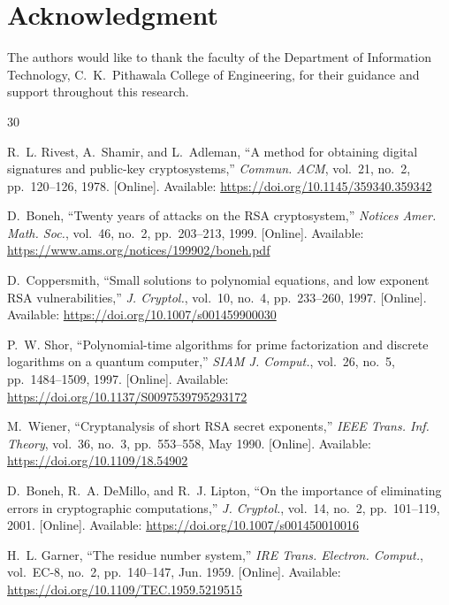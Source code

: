 \documentclass[journal]{IEEEtran}
\begin{document}
\section*{Acknowledgment}

The authors would like to thank the faculty of the Department of Information Technology, C.~K.~Pithawala College of Engineering, for their guidance and support throughout this research.


\ifCLASSOPTIONcaptionsoff
\newpage
\fi


\begin{thebibliography}{30}

R.~L. Rivest, A.~Shamir, and L.~Adleman, ``A method for obtaining digital signatures and public-key cryptosystems,'' \textit{Commun. ACM}, vol.~21, no.~2, pp.~120--126, 1978. [Online]. Available: \url{https://doi.org/10.1145/359340.359342}

D.~Boneh, ``Twenty years of attacks on the RSA cryptosystem,'' \textit{Notices Amer. Math. Soc.}, vol.~46, no.~2, pp.~203--213, 1999. [Online]. Available: \url{https://www.ams.org/notices/199902/boneh.pdf}

D.~Coppersmith, ``Small solutions to polynomial equations, and low exponent RSA vulnerabilities,'' \textit{J. Cryptol.}, vol.~10, no.~4, pp.~233--260, 1997. [Online]. Available: \url{https://doi.org/10.1007/s001459900030}

P.~W. Shor, ``Polynomial-time algorithms for prime factorization and discrete logarithms on a quantum computer,'' \textit{SIAM J. Comput.}, vol.~26, no.~5, pp.~1484--1509, 1997. [Online]. Available: \url{https://doi.org/10.1137/S0097539795293172}

M.~Wiener, ``Cryptanalysis of short RSA secret exponents,'' \textit{IEEE Trans. Inf. Theory}, vol.~36, no.~3, pp.~553--558, May 1990. [Online]. Available: \url{https://doi.org/10.1109/18.54902}

D.~Boneh, R.~A. DeMillo, and R.~J. Lipton, ``On the importance of eliminating errors in cryptographic computations,'' \textit{J. Cryptol.}, vol.~14, no.~2, pp.~101--119, 2001. [Online]. Available: \url{https://doi.org/10.1007/s001450010016}

H.~L. Garner, ``The residue number system,'' \textit{IRE Trans. Electron. Comput.}, vol.~EC-8, no.~2, pp.~140--147, Jun. 1959. [Online]. Available: \url{https://doi.org/10.1109/TEC.1959.5219515}


\end{thebibliography}
\end{document}
